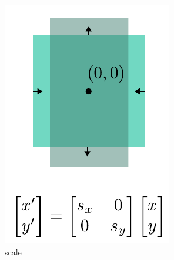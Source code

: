 \begin{figure}[t]
    \begin{subfigure}[t]{0.195\linewidth}
        \centering
        \includegraphics[width=\linewidth]{imgs/scale.pdf}
        \caption{\label{fig:scale} scale}
    \end{subfigure}
    \begin{subfigure}[t]{0.195\linewidth}
        \centering

\end{subfigure}
\end{figure}
